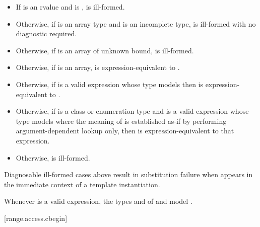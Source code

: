 \begin{itemize}
\item
  If  is an rvalue and
   is ,
   is ill-formed.

\item
  Otherwise, if  is an array type and
   is an incomplete type,
   is ill-formed with no diagnostic required.

\item
  Otherwise, if  is an array of unknown bound,
   is ill-formed.

\item
  Otherwise, if  is an array,
   is expression-equivalent to
  .

\item
  Otherwise, if 
  is a valid expression whose type models
  then  is expression-equivalent to
  .

\item
  Otherwise, if  is a class or enumeration type and
  is a valid expression whose type models
  where the meaning of  is established as-if by performing
  argument-dependent lookup only,
  then  is expression-equivalent to
  that expression.

\item
  Otherwise,  is ill-formed.
\end{itemize}

\pnum
\begin{note}
Diagnosable ill-formed cases above
result in substitution failure when 
appears in the immediate context of a template instantiation.
\end{note}

\pnum
\begin{note}
Whenever  is a valid expression,
the types  and  of
 and 
model .
\end{note}

[range.access.cbegin]{}
%

